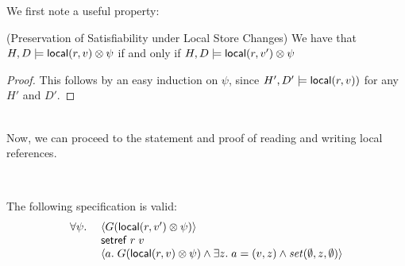 We first note a useful property:

\begin{lemma}{(Preservation of Satisfiability under Local Store Changes)}
We have that $H, D \models \mathsf{local}({r}, {v}) \otimes \psi$ if and only if $H, D \models \mathsf{local}({r}, {v'}) \otimes \psi$ 
\end{lemma}
\begin{proof}
This follows by an easy induction on $\psi$, since $H', D' \models \mathsf{local}({r}, {v}))$ for any $H'$ and $D'$. 
\end{proof}

\ \\

\noindent Now, we can proceed to the statement and proof of reading and writing
local references. 

\ \\


\begin{prop*}
The following specification is valid:
\begin{displaymath}
\begin{array}{ll}
\forall \psi.\; 
  &    \left<G(\mathsf{local}({r}, {v'}) \otimes \psi)\right> \\
  &    \mathsf{setref}\; r\;v \\
  &    \left<a.\; G(\mathsf{local}({r}, {v}) \otimes \psi) 
                  \land  \exists z.\;a = (v,z) \land \mathit{set}(\emptyset, z, \emptyset)
       \right> 
\end{array}
\end{displaymath}
\end{prop*}

